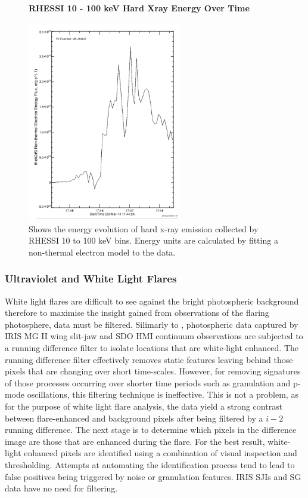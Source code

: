 \begin{figure}[H]
  \begin{center}
  \textbf{RHESSI 10 - 100 keV Hard Xray Energy Over Time}\par\medskip
  \includegraphics[width=0.6\textwidth]{rhessi-energy-curve}
  \end{center}
  \caption{Shows the energy evolution of hard x-ray emission collected by RHESSI 10 to 100 keV bins. Energy units are calculated by fitting a non-thermal electron model to the data. }\label{erhessi}
\end{figure}

\subsubsection{Ultraviolet and White Light Flares}
White light flares are difficult to see against the bright photospheric background therefore to maximise the insight gained from observations of the flaring photosphere, data must be filtered. Silimarly to \cite{2014ApJ...783...98K}, photospheric data captured by IRIS MG II wing slit-jaw and SDO HMI continuum observations are subjected to a running difference filter to isolate locations that are white-light enhanced. The running difference filter effectively removes static features leaving behind those pixels that are changing over short time-scales. However, for removing signatures of those processes occurring over shorter time periods such as granulation and p-mode oscillations, this filtering technique is ineffective. This is not a problem, as for the purpose of white light flare analysis, the data yield a strong contrast between flare-enhanced and background pixels after being filtered by a $i-2$ running difference. The next stage is to determine which pixels in the difference image are those that are enhanced during the flare. For the best result, white-light enhanced pixels are identified using a combination of visual inspection and thresholding. Attempts at automating the identification process tend to lead to false positives being triggered by noise or granulation features. IRIS SJIs and SG data have no need for filtering.

